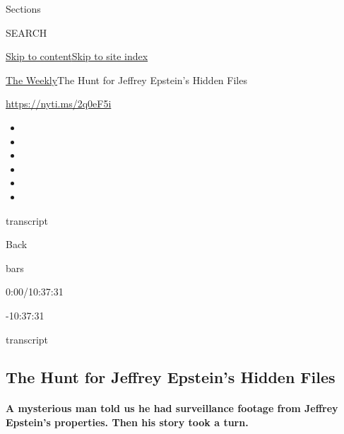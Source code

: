 Sections

SEARCH

\protect\hyperlink{site-content}{Skip to
content}\protect\hyperlink{site-index}{Skip to site index}

\href{/section/the-weekly}{The Weekly}\textbar{}The Hunt for Jeffrey
Epstein's Hidden Files

\url{https://nyti.ms/2q0eF5i}

\begin{itemize}
\item
\item
\item
\item
\item
\item
\end{itemize}

transcript

Back

bars

0:00/10:37:31

-10:37:31

transcript

\hypertarget{the-hunt-for-jeffrey-epsteins-hidden-files}{%
\subsection{The Hunt for Jeffrey Epstein's Hidden
Files}\label{the-hunt-for-jeffrey-epsteins-hidden-files}}

\hypertarget{a-mysterious-man-told-us-he-had-surveillance-footage-from-jeffrey-epsteins-properties-then-his-story-took-a-turn}{%
\paragraph{A mysterious man told us he had surveillance footage from
Jeffrey Epstein's properties. Then his story took a
turn.}\label{a-mysterious-man-told-us-he-had-surveillance-footage-from-jeffrey-epsteins-properties-then-his-story-took-a-turn}}

